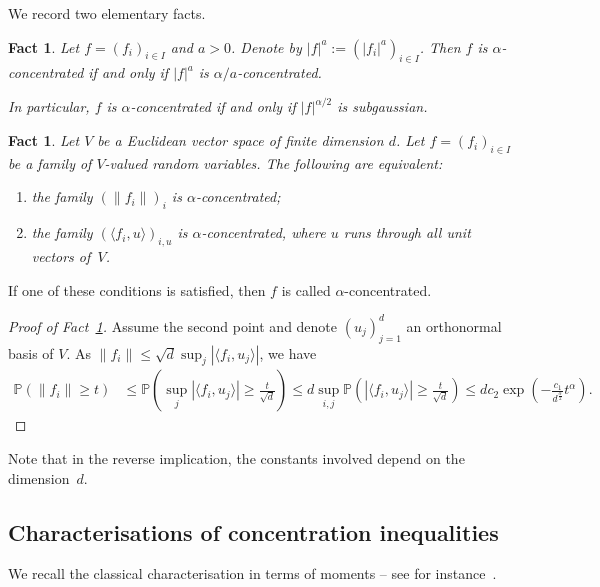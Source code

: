 \documentclass[11pt,leqno]{article}
\theoremstyle{plain}
\newtheorem{fact}[theorem]{Fact}
\theoremstyle{definition}
\theoremstyle{remark}
\numberwithin{equation}{section}
\begin{document}
We record two elementary facts.
\begin{fact}\label{fact:concentration-moments}
Let $f=(f_{i})_{i\in I}$ and $a>0$. Denote
by $|f|^{a}:=(|f_{i}|^{a})_{i\in I}$. Then $f$ is $\alpha$-concentrated if and only if
$|f|^{a}$ is $\alpha/a$-concentrated.

In
particular, $f$ is $\alpha$-concentrated if and only if $|f|^{\alpha/2}$
is subgaussian.
\end{fact}

\begin{fact}\label{def:vectorvalued}
Let $V$ be a Euclidean vector space of finite dimension $d$. Let $f=(f_{i})_{i\in I}$
be a family of $V$-valued random variables. The following are equivalent:
\begin{enumerate}
\item the family $(\|f_{i}\|)_{i}$ is $\alpha$-concentrated; 
\item the family $(\langle f_{i},u\rangle)_{i,u}$ is $\alpha$-concentrated,
where $u$ runs through all unit vectors of~$V$. 
\end{enumerate}
\end{fact}

If one of these conditions is satisfied, then $f$ is called $\alpha$-concentrated. 

\begin{proof}[Proof of Fact~\ref{def:vectorvalued}]
Assume the second point and denote $(u_j)_{j=1}^d$ an orthonormal basis of $V$. As $\|f_i\| \le \sqrt{d}\sup_j |\langle f_i,u_j\rangle|$, we have
\begin{align*}
\mathbb{P}\left(\|f_i\| \ge t\right) & \le \mathbb{P}\left(\sup_j  |\langle f_i,u_j\rangle| \ge \frac{t}{\sqrt{d}} \right) \le d \sup_{i,j} \mathbb{P}\left(  |\langle f_i,u_j\rangle| \ge \frac{t}{\sqrt{d}} \right) \le dc_2 \exp\left(-\frac{c_1}{d^{\frac{\alpha}{2}}}t^\alpha \right).
\end{align*}
\end{proof}

Note that in the reverse implication, the constants involved depend on the dimension~$d$.



\subsection{Characterisations of concentration inequalities}

We recall the classical characterisation in terms of moments -- see for instance~\cite[Lemma~3.1]{Pisier}. 
\end{document}
